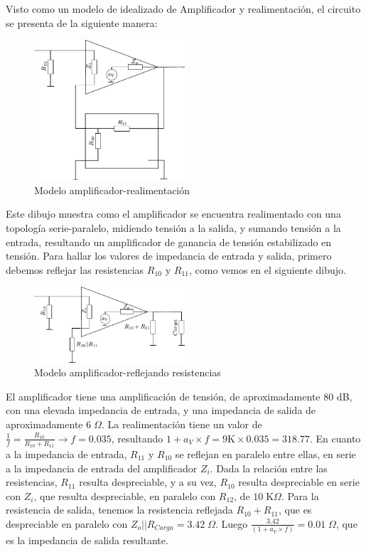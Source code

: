 \documentclass[a4paper,12pt,twoside]{article}
\begin{document}
Visto como un modelo de idealizado de Amplificador y realimentación, el circuito se presenta de la siguiente manera:

\begin{figure}[H]
	\centering
	\includegraphics[width=0.5\textwidth]{img/realimentacion}
	\caption{Modelo amplificador-realimentación}
	\label{fig:ampli_realimentacion}
\end{figure}

Este dibujo muestra como el amplificador se encuentra realimentado con una topología serie-paralelo, midiendo tensión a la salida, y sumando tensión a la entrada, resultando un amplificador de ganancia de tensión estabilizado en tensión. Para hallar los valores de impedancia de entrada y salida, primero debemos reflejar las resistencias $R_{10}$ y $R_{11}$, como vemos en el siguiente dibujo.

\begin{figure}[H]
	\centering
	\includegraphics[width=0.5\textwidth]{img/reflejo}
	\caption{Modelo amplificador-reflejando resistencias}
	\label{fig:ampli_reflejo}
\end{figure}

El amplificador tiene una amplificación de tensión, de aproximadamente $80$ dB, con una elevada impedancia de entrada, y una impedancia de salida de aproximadamente $6\;\Omega$.
La realimentación tiene un valor de $\frac{1}{f} = \frac{R_{10}}{R_{10} + R_{11}} \rightarrow f = 0.035$, resultando $1+a_V\times f = 9\mathrm{K} \times 0.035 = 318.77$. En cuanto a la impedancia de entrada, $R_{11}$ y $R_{10}$ se reflejan en paralelo entre ellas, en serie a la impedancia de entrada del amplificador $Z_i$. Dada la relación entre las resistencias, $R_{11}$ resulta despreciable, y a su vez, $R_{10}$ resulta despreciable en serie con $Z_i$, que resulta despreciable, en paralelo con $R_{12}$, de $10\; \mathrm{K}\Omega$. Para la resistencia de salida, tenemos la resistencia reflejada $R_{10} + R_{11}$, que es despreciable en paralelo con $Z_o || R_{Carga} = 3.42\; \Omega$. Luego $\frac{3.42}{(1 + a_V \times f)} = 0.01\; \Omega$, que es la impedancia de salida resultante.
\end{document}
